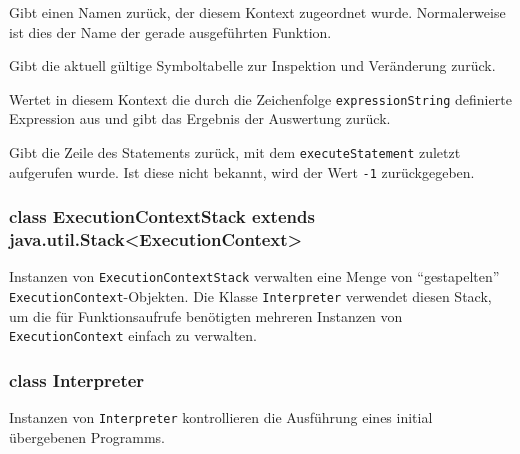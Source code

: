 \begin{description}
    Gibt einen Namen zurück, der diesem Kontext zugeordnet wurde. Normalerweise ist dies der Name der gerade ausgeführten Funktion.

    Gibt die aktuell gültige Symboltabelle zur Inspektion und Veränderung zurück.


    Wertet in diesem Kontext die durch die Zeichenfolge \texttt{expressionString} definierte Expression aus und gibt das Ergebnis der Auswertung zurück.

    Gibt die Zeile des Statements zurück, mit dem \texttt{executeStatement} zuletzt aufgerufen wurde. Ist diese nicht bekannt, wird der Wert \texttt{-1} zurückgegeben.
\end{description}


\subsubsection{class ExecutionContextStack extends java.util.Stack<ExecutionContext>}

Instanzen von \texttt{ExecutionContextStack} verwalten eine Menge von "`gestapelten"' \texttt{ExecutionContext}-Objekten. Die Klasse \texttt{Interpreter} verwendet diesen Stack, um die für Funktionsaufrufe benötigten mehreren Instanzen von \texttt{ExecutionContext} einfach zu verwalten.

\subsubsection{class Interpreter}

Instanzen von \texttt{Interpreter} kontrollieren die Ausführung eines initial übergebenen Programms.

